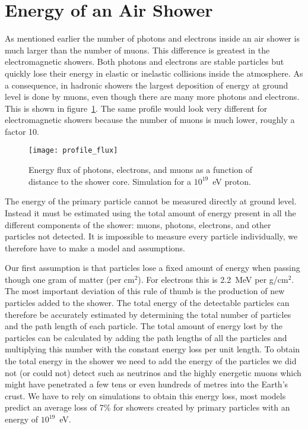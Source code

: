 \section{Energy of an Air Shower}
As mentioned earlier the number of photons and electrons inside an air shower is much larger than the number of muons. This difference is greatest in the electromagnetic showers. Both photons and electrons are stable particles but quickly lose their energy in elastic or inelastic collisions inside the atmosphere. As a consequence, in hadronic showers the largest deposition of energy at ground level is done by muons, even though there are many more photons and electrons. This is shown in figure~\ref{fig:profile_flux}. The same profile would look very different for electromagnetic showers because the number of muons is much lower, roughly a factor 10.

\begin{figure}\begin{center}
\texttt{[image: profile\_flux]}%
\caption{Energy flux of photons, electrons, and muons as a function of distance to the shower core. Simulation for a $10^{19}$~eV proton.}\label{fig:profile_flux}
\end{center}\end{figure}

The energy of the primary particle cannot be measured directly at ground level. Instead it must be estimated using the total amount of energy present in all the different components of the shower: muons, photons, electrons, and other particles not detected. It is impossible to measure every particle individually, we therefore have to make a model and assumptions.

Our first assumption is that particles lose a fixed amount of energy when passing though one gram of matter (per cm$^2$). For electrons this is 2.2~MeV per g/cm$^2$. The most important deviation of this rule of thumb is the production of new particles added to the shower. The total energy of the detectable particles can therefore be accurately estimated by determining the total number of particles and the path length of each particle. The total amount of energy lost by the particles can be calculated by adding the path lengths of all the particles and multiplying this number with the constant energy loss per unit length. To obtain the total energy in the shower we need to add the energy of the particles we did not (or could not) detect such as neutrinos and the highly energetic muons which might have penetrated a few tens or even hundreds of metres into the Earth's crust. We have to rely on simulations to obtain this energy loss, most models predict an average loss of 7\% for showers created by primary particles with an energy of $10^{19}$~eV.

